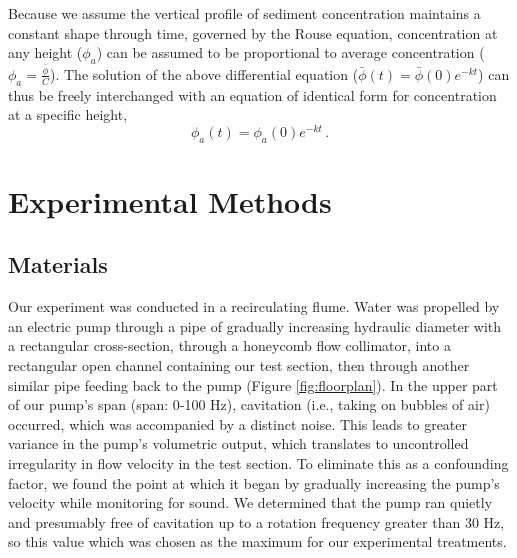 \documentclass{scrreprt}
\begin{document}
Because we assume the vertical profile of sediment concentration maintains a constant shape through time, governed by the Rouse equation, concentration at any height ($\phi_a$) can be assumed to be proportional to average concentration ($\phi_a=\frac{\bar{\phi}}{C}$). The solution of the above differential equation ($\bar{\phi}(t) = \bar{\phi}(0)e^{-kt}$) can thus be freely interchanged with an equation of identical form for concentration at a specific height,
\begin{equation}
    \phi_a(t) = \phi_a(0)e^{-kt}\,.
    \label{eq:specconc}
\end{equation}

\section{Experimental Methods}

\subsection{Materials}

Our experiment was conducted in a recirculating flume. Water was propelled by an electric pump through a pipe of gradually increasing hydraulic diameter with a rectangular cross-section, through a honeycomb flow collimator, into a rectangular open channel containing our test section, then through another similar pipe feeding back to the pump (Figure \ref{fig:floorplan}). In the upper part of our pump's span (span: 0-100 Hz), cavitation (i.e., taking on bubbles of air) occurred, which was accompanied by a distinct noise. This leads to greater variance in the pump's volumetric output, which translates to uncontrolled irregularity in flow velocity in the test section. To eliminate this as a confounding factor, we found the point at which it began by gradually increasing the pump's velocity while monitoring for sound. We determined that the pump ran quietly and presumably free of cavitation up to a rotation frequency greater than 30 Hz, so this value which was chosen as the maximum for our experimental treatments.
\end{document}
